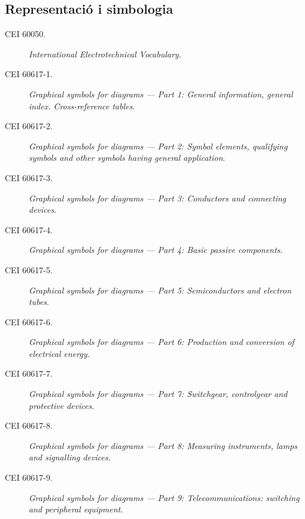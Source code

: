 \subsection*{Representació i simbologia}
\begin{description}
    \item [\hspace{5mm}CEI 60050.] \textit{International Electrotechnical Vocabulary}. 
    \item [\hspace{5mm}CEI 60617-1.] \textit{Graphical symbols for diagrams --- Part 1: General information, general index. Cross-reference tables}.
    \item [\hspace{5mm}CEI 60617-2.] \textit{Graphical symbols for diagrams --- Part 2: Symbol elements, qualifying symbols and other symbols having general application}.
    \item [\hspace{5mm}CEI 60617-3.] \textit{Graphical symbols for diagrams --- Part 3: Conductors and connecting devices}.
    \item [\hspace{5mm}CEI 60617-4.] \textit{Graphical symbols for diagrams --- Part 4: Basic passive components}.
    \item [\hspace{5mm}CEI 60617-5.] \textit{Graphical symbols for diagrams --- Part 5: Semiconductors and electron tubes}.
    \item [\hspace{5mm}CEI 60617-6.] \textit{Graphical symbols for diagrams --- Part 6: Production and conversion of electrical energy}.
    \item [\hspace{5mm}CEI 60617-7.] \textit{Graphical symbols for diagrams --- Part 7: Switchgear, controlgear and protective devices}.
    \item [\hspace{5mm}CEI 60617-8.] \textit{Graphical symbols for diagrams --- Part 8: Measuring instruments, lamps and signalling devices}.
    \item [\hspace{5mm}CEI 60617-9.] \textit{Graphical symbols for diagrams --- Part 9: Telecommunications: switching and peripheral equipment}.

\end{description}
